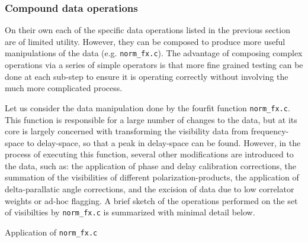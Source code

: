 \subsubsection{Compound data operations}

On their own each of the specific data operations listed in the previous section are of limited utility. However, they can be composed to produce more useful manipulations of the data (e.g. \texttt{norm\_fx.c}). The advantage of composing complex operations via a series of simple operators is that more fine grained testing can be done at each sub-step to ensure it is operating correctly without involving the much more complicated process.

Let us consider the data manipulation done by the fourfit function \texttt{norm\_fx.c}. This function is responsible for a large number of changes to the data, but at its core is largely concerned with transforming the visibility data from frequency-space to delay-space, so that a peak in delay-space can be found. However, in the process of executing this function, several other modifications are introduced to the data, such as: the application of phase and delay calibration corrections, the summation of the visibilities of different polarization-products, the application of delta-parallatic angle corrections, and the excision of data due to low correlator weights or ad-hoc flagging. A brief sketch of the operations performed on the set of visibilties by \texttt{norm\_fx.c} is summarized with minimal detail below.


\begin{algorithm}[h!]
  \caption{Application of \texttt{norm\_fx.c}}
    \begin{algorithmic}[1]
    \end{algorithmic}
  \label{algo:normfx}
\end{algorithm}

